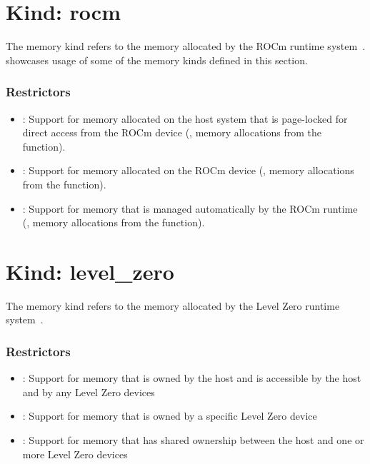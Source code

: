 \section{Kind: rocm}

The  memory kind refers to the memory allocated by the ROCm
runtime system~\cite{rocmref}. 
showcases usage of some of the memory kinds defined in this section. 

\subsubsection{Restrictors}

\begin{itemize}

\item {}: Support for memory allocated on the host system that
    is page-locked for direct access from the ROCm device (\eg, memory
        allocations from the  function).

\item {}: Support for memory allocated on the ROCm device
    (\eg, memory allocations from the  function).

\item {}: Support for memory that is managed automatically
    by the ROCm runtime (\eg, memory allocations from the
         function).

\end{itemize}

\section{Kind: level\_zero}

The  memory kind refers to the memory allocated by the
Level Zero runtime system~\cite{zeref}.

\subsubsection{Restrictors}

\begin{itemize}

\item {}: Support for memory that is owned by the host and is accessible by the host and by any Level Zero devices

\item {}: Support for memory that is owned by a specific Level Zero device

\item {}: Support for memory that has shared ownership between the host and one or more Level Zero devices

\end{itemize}

